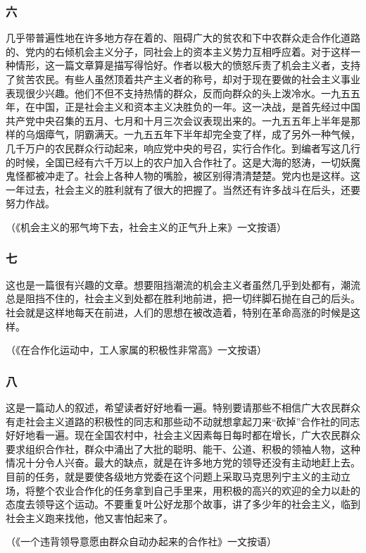\documentclass[cn,11pt,chinese]{elegantbook}
\def\myformat#1{\hfil\hfil #1}
\begin{document}
\subsubsection*{\myformat{六}}
几乎带普遍性地在许多地方存在着的、阻碍广大的贫农和下中农群众走合作化道路的、党内的右倾机会主义分子，同社会上的资本主义势力互相呼应着。对于这样一种情形，这一篇文章算是描写得恰好。作者以极大的愤怒斥责了机会主义者，支持了贫苦农民。有些人虽然顶着共产主义者的称号，却对于现在要做的社会主义事业表现很少兴趣。他们不但不支持热情的群众，反而向群众的头上泼冷水。一九五五年，在中国，正是社会主义和资本主义决胜负的一年。这一决战，是首先经过中国共产党中央召集的五月、七月和十月三次会议表现出来的。一九五五年上半年是那样的乌烟瘴气，阴霸满天。一九五五年下半年却完全变了样，成了另外一种气候，几千万户的农民群众行动起来，响应党中央的号召，实行合作化。到编者写这几行的时候，全国已经有六千万以上的农户加入合作社了。这是大海的怒涛，一切妖魔鬼怪都被冲走了。社会上各种人物的嘴脸，被区别得清清楚楚。党内也是这样。这一年过去，社会主义的胜利就有了很大的把握了。当然还有许多战斗在后头，还要努力作战。\\
\begin{flushright}（《机会主义的邪气垮下去，社会主义的正气升上来》一文按语）\end{flushright}
\subsubsection*{\myformat{七}}
这也是一篇很有兴趣的文章。想要阻挡潮流的机会主义者虽然几乎到处都有，潮流总是阻挡不住的，社会主义到处都在胜利地前进，把一切绊脚石抛在自己的后头。社会就是这样地每天在前进，人们的思想在被改造着，特别在革命高涨的时候是这样。\\
\begin{flushright}（《在合作化运动中，工人家属的积极性非常高》一文按语）\end{flushright}
\subsubsection*{\myformat{八}}
这是一篇动人的叙述，希望读者好好地看一遍。特别要请那些不相信广大农民群众有走社会主义道路的积极性的同志和那些动不动就想拿起刀来“砍掉”合作社的同志好好地看一遍。现在全国农村中，社会主义因素每日每时都在增长，广大农民群众要求组织合作社，群众中涌出了大批的聪明、能干、公道、积极的领袖人物，这种情况十分令人兴奋。最大的缺点，就是在许多地方党的领导还没有主动地赶上去。目前的任务，就是要使各级地方党委在这个问题上采取马克思列宁主义的主动立场，将整个农业合作化的任务拿到自己手里来，用积极的高兴的欢迎的全力以赴的态度去领导这个运动。不要重复叶公好龙那个故事，讲了多少年的社会主义，临到社会主义跑来找他，他又害怕起来了。\\
\begin{flushright}（《一个违背领导意愿由群众自动办起来的合作社》一文按语）\end{flushright}
\end{document}
